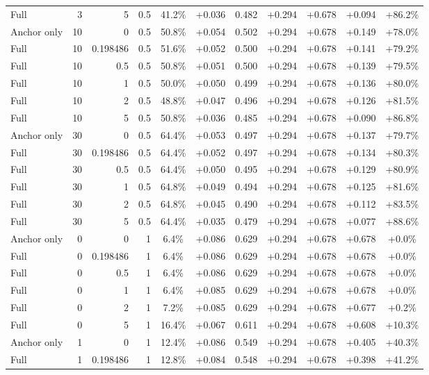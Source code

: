 \begin{table}[htbp]
\begin{tabular}{lrrrccccccc}
Full & 3 & 5 & 0.5 & 41.2\% & +0.036 & 0.482 & +0.294 & +0.678 & +0.094 & +86.2\% \\
Anchor only & 10 & 0 & 0.5 & 50.8\% & +0.054 & 0.502 & +0.294 & +0.678 & +0.149 & +78.0\% \\
Full & 10 & 0.198486 & 0.5 & 51.6\% & +0.052 & 0.500 & +0.294 & +0.678 & +0.141 & +79.2\% \\
Full & 10 & 0.5 & 0.5 & 50.8\% & +0.051 & 0.500 & +0.294 & +0.678 & +0.139 & +79.5\% \\
Full & 10 & 1 & 0.5 & 50.0\% & +0.050 & 0.499 & +0.294 & +0.678 & +0.136 & +80.0\% \\
Full & 10 & 2 & 0.5 & 48.8\% & +0.047 & 0.496 & +0.294 & +0.678 & +0.126 & +81.5\% \\
Full & 10 & 5 & 0.5 & 50.8\% & +0.036 & 0.485 & +0.294 & +0.678 & +0.090 & +86.8\% \\
Anchor only & 30 & 0 & 0.5 & 64.4\% & +0.053 & 0.497 & +0.294 & +0.678 & +0.137 & +79.7\% \\
Full & 30 & 0.198486 & 0.5 & 64.4\% & +0.052 & 0.497 & +0.294 & +0.678 & +0.134 & +80.3\% \\
Full & 30 & 0.5 & 0.5 & 64.4\% & +0.050 & 0.495 & +0.294 & +0.678 & +0.129 & +80.9\% \\
Full & 30 & 1 & 0.5 & 64.8\% & +0.049 & 0.494 & +0.294 & +0.678 & +0.125 & +81.6\% \\
Full & 30 & 2 & 0.5 & 64.8\% & +0.045 & 0.490 & +0.294 & +0.678 & +0.112 & +83.5\% \\
Full & 30 & 5 & 0.5 & 64.4\% & +0.035 & 0.479 & +0.294 & +0.678 & +0.077 & +88.6\% \\
Anchor only & 0 & 0 & 1 & 6.4\% & +0.086 & 0.629 & +0.294 & +0.678 & +0.678 & +0.0\% \\
Full & 0 & 0.198486 & 1 & 6.4\% & +0.086 & 0.629 & +0.294 & +0.678 & +0.678 & +0.0\% \\
Full & 0 & 0.5 & 1 & 6.4\% & +0.086 & 0.629 & +0.294 & +0.678 & +0.678 & +0.0\% \\
Full & 0 & 1 & 1 & 6.4\% & +0.085 & 0.629 & +0.294 & +0.678 & +0.678 & +0.0\% \\
Full & 0 & 2 & 1 & 7.2\% & +0.085 & 0.629 & +0.294 & +0.678 & +0.677 & +0.2\% \\
Full & 0 & 5 & 1 & 16.4\% & +0.067 & 0.611 & +0.294 & +0.678 & +0.608 & +10.3\% \\
Anchor only & 1 & 0 & 1 & 12.4\% & +0.086 & 0.549 & +0.294 & +0.678 & +0.405 & +40.3\% \\
Full & 1 & 0.198486 & 1 & 12.8\% & +0.084 & 0.548 & +0.294 & +0.678 & +0.398 & +41.2\% \\

\end{tabular}
\end{table}
